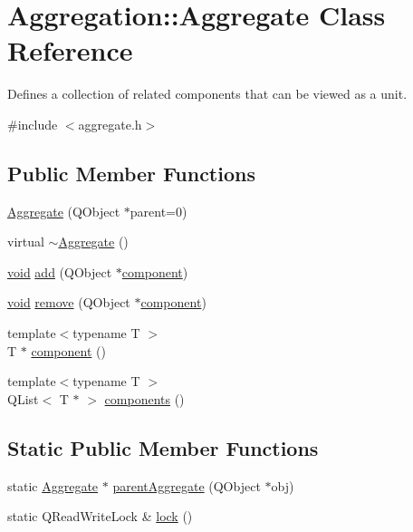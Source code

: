 \hypertarget{class_aggregation_1_1_aggregate}{\section{\-Aggregation\-:\-:\-Aggregate \-Class \-Reference}
\label{class_aggregation_1_1_aggregate}
}


\-Defines a collection of related components that can be viewed as a unit.  




{\ttfamily \#include $<$aggregate.\-h$>$}

\subsection*{\-Public \-Member \-Functions}
\begin{DoxyCompactItemize}
\item 
\hyperlink{class_aggregation_1_1_aggregate_a5579d6da6c4cf165eead1a744e2f6061}{\-Aggregate} (\-Q\-Object $\ast$parent=0)
\item 
virtual \hyperlink{class_aggregation_1_1_aggregate_abb1a5795372eb1118c1cc82ac47a2783}{$\sim$\-Aggregate} ()
\item 
\hyperlink{group___u_a_v_objects_plugin_ga444cf2ff3f0ecbe028adce838d373f5c}{void} \hyperlink{class_aggregation_1_1_aggregate_ab6c5e73d1c128d819d57fe4e53596356}{add} (\-Q\-Object $\ast$\hyperlink{class_aggregation_1_1_aggregate_a6509e7e80142e406ffa24363bb457b59}{component})
\item 
\hyperlink{group___u_a_v_objects_plugin_ga444cf2ff3f0ecbe028adce838d373f5c}{void} \hyperlink{class_aggregation_1_1_aggregate_a83f9cd3aa5d70ce541280d6366c6459b}{remove} (\-Q\-Object $\ast$\hyperlink{class_aggregation_1_1_aggregate_a6509e7e80142e406ffa24363bb457b59}{component})
\item 
{\footnotesize template$<$typename T $>$ }\\\-T $\ast$ \hyperlink{class_aggregation_1_1_aggregate_a6509e7e80142e406ffa24363bb457b59}{component} ()
\item 
{\footnotesize template$<$typename T $>$ }\\\-Q\-List$<$ \-T $\ast$ $>$ \hyperlink{class_aggregation_1_1_aggregate_ad2189eec2b5f725c0a0db81d5fbf3e25}{components} ()
\end{DoxyCompactItemize}
\subsection*{\-Static \-Public \-Member \-Functions}
\begin{DoxyCompactItemize}
\item 
static \hyperlink{class_aggregation_1_1_aggregate}{\-Aggregate} $\ast$ \hyperlink{class_aggregation_1_1_aggregate_a0aa7a223205e78e49b6294bb0d165fc8}{parent\-Aggregate} (\-Q\-Object $\ast$obj)
\item 
static \-Q\-Read\-Write\-Lock \& \hyperlink{class_aggregation_1_1_aggregate_add1e8a0af97e3413dbabb4410a46593c}{lock} ()
\end{DoxyCompactItemize}
